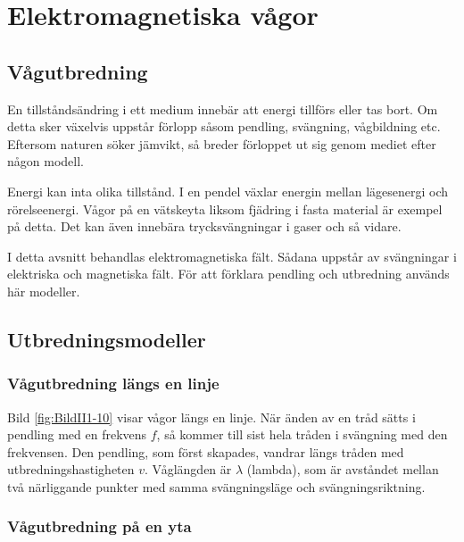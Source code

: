 \section{Elektromagnetiska vågor}



\subsection{Vågutbredning}

En tillståndsändring i ett medium innebär att energi tillförs eller tas bort.
Om detta sker växelvis uppstår förlopp såsom pendling, svängning, vågbildning etc.
Eftersom naturen söker jämvikt, så breder förloppet ut sig genom mediet efter
någon modell.

Energi kan inta olika tillstånd. I en pendel växlar energin mellan lägesenergi
och rörelseenergi.
Vågor på en vätskeyta liksom fjädring i fasta material är exempel på detta.
Det kan även innebära trycksvängningar i gaser och så vidare.

I detta avsnitt behandlas elektromagnetiska fält.
Sådana uppstår av svängningar i elektriska och magnetiska fält.
För att förklara pendling och utbredning används här modeller.

\subsection{Utbredningsmodeller}

\subsubsection{Vågutbredning längs en linje}


Bild \ref{fig:BildII1-10} visar vågor längs en linje.
När änden av en tråd sätts i pendling med en frekvens \(f\), så kommer till
sist hela tråden i svängning med den frekvensen.
Den pendling, som först skapades, vandrar längs tråden med
utbredningshastigheten \(v\).
Våglängden är \(\lambda\) (lambda), som är avståndet mellan två närliggande
punkter med samma svängningsläge och svängningsriktning.

\subsubsection{Vågutbredning på en yta}

